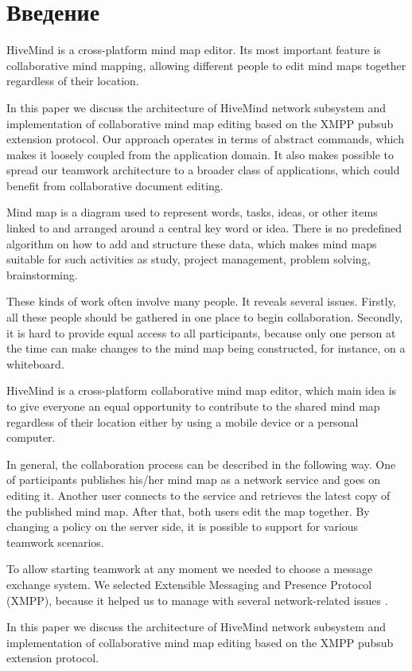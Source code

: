 \newpage

\chapter*{Введение}\label{chap:introduction}

HiveMind is a cross-platform mind map editor. Its most important feature is
collaborative mind mapping, allowing different people to edit mind maps
together regardless of their location.

In this paper we discuss the architecture of HiveMind network subsystem and
implementation of collaborative mind map editing based on the XMPP pubsub
extension protocol. Our approach operates in terms of abstract commands, which
makes it loosely coupled from the application domain. It also makes possible
to spread our teamwork architecture to a broader class of applications, which
could benefit from collaborative document editing.

Mind map is a diagram used to represent words, tasks, ideas, or other items
linked to and arranged around a central key word or idea. There is no predefined
algorithm on how to add and structure these data, which makes mind maps suitable
for such activities as study, project management, problem solving, brainstorming.

These kinds of work often involve many people. It reveals several
issues. Firstly, all these people should be gathered in one place to begin
collaboration. Secondly, it is hard to provide equal access to all participants,
because only one person at the time can make changes to the mind map being
constructed, for instance, on a whiteboard.

HiveMind is a cross-platform collaborative mind map editor, which main idea is
to give everyone an equal opportunity to contribute to the shared mind map
regardless of their location either by using a mobile device or a personal
computer.

In general, the collaboration process can be described in the following way. One
of participants publishes his/her mind map as a network service and goes on
editing it. Another user connects to the service and retrieves the latest copy
of the published mind map. After that, both users edit the map together. By
changing a policy on the server side, it is possible to support for various
teamwork scenarios.

To allow starting teamwork at any moment we needed to choose a message exchange
system. We selected Extensible Messaging and Presence Protocol (XMPP), because
it helped us to manage with several network-related issues
\cite{hivemind-8th-fruct}.

In this paper we discuss the architecture of HiveMind network subsystem and
implementation of collaborative mind map editing based on the XMPP pubsub
extension protocol.